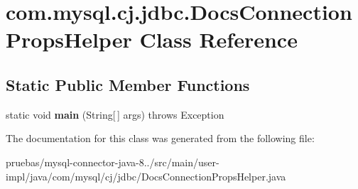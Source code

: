 \hypertarget{classcom_1_1mysql_1_1cj_1_1jdbc_1_1_docs_connection_props_helper}{}\section{com.\+mysql.\+cj.\+jdbc.\+Docs\+Connection\+Props\+Helper Class Reference}
\label{classcom_1_1mysql_1_1cj_1_1jdbc_1_1_docs_connection_props_helper}
\subsection*{Static Public Member Functions}
\begin{DoxyCompactItemize}
\item 
\mbox{\label{classcom_1_1mysql_1_1cj_1_1jdbc_1_1_docs_connection_props_helper_aae494d4fcd9ba04815a827a11b39a805}} 
static void {\bfseries main} (String\mbox{[}$\,$\mbox{]} args)  throws Exception 
\end{DoxyCompactItemize}


The documentation for this class was generated from the following file\+:\begin{DoxyCompactItemize}
\item 
pruebas/mysql-\/connector-\/java-\/8../src/main/user-\/impl/java/com/mysql/cj/jdbc/Docs\+Connection\+Props\+Helper.\+java\end{DoxyCompactItemize}
